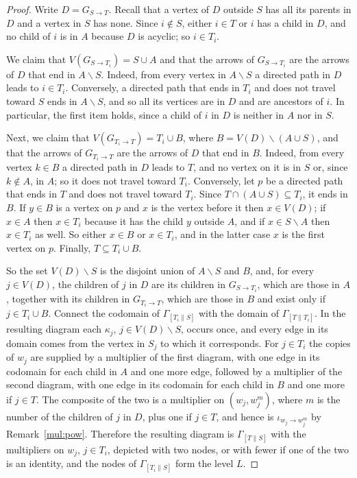 \documentclass[12pt]{amsart}
\theoremstyle{plain}
\theoremstyle{definition}
\theoremstyle{remark}
\numberwithin{equation}{section}
\theoremstyle{plain}
\newcommand{\0}{\emptyset}
\newcommand{\sub}{\subseteq}
\newcommand{\mi}{\smallsetminus}
\newcommand{\stri}{\Gamma}
\begin{document}
\begin{proof}
Write $D = G_{S \rightarrow T}$. Recall that a vertex of $D$ outside $S$ has all its parents in $D$ and a vertex in $S$ has none. Since $i \notin S$, either $i \in T$ or $i$ has a child in $D$, and no child of $i$ is in $A$ because $D$ is acyclic; so $i \in T_i$.

We claim that $V(G_{S \rightarrow T_i}) = S \cup A$ and that the arrows of $G_{S \rightarrow T_i}$ are the arrows of $D$ that end in $A \mi S$. Indeed, from every vertex in $A \mi S$ a directed path in $D$ leads to $i \in T_i$. Conversely, a directed path that ends in $T_i$ and does not travel toward $S$ ends in $A \mi S$, and so all its vertices are in $D$ and are ancestors of $i$. In particular, the first item holds, since a child of $i$ in $D$ is neither in $A$ nor in $S$.

Next, we claim that $V(G_{T_i \rightarrow T}) = T_i \cup B$, where $B = V(D) \mi (A \cup S)$, and that the arrows of $G_{T_i \rightarrow T}$ are the arrows of $D$ that end in $B$. Indeed, from every vertex $k \in B$ a directed path in $D$ leads to $T$, and no vertex on it is in $S$ or, since $k \notin A$, in $A$; so it does not travel toward $T_i$. Conversely, let $p$ be a directed path that ends in $T$ and does not travel toward $T_i$. Since $T \cap (A \cup S) \sub T_i$, it ends in $B$. If $y \in B$ is a vertex on $p$ and $x$ is the vertex before it then $x \in V(D)$; if $x \in A$ then $x \in T_i$ because it has the child $y$ outside $A$, and if $x \in S \mi A$ then $x \in T_i$ as well. So either $x \in B$ or $x \in T_i$, and in the latter case $x$ is the first vertex on $p$. Finally, $T \sub T_i \cup B$.

So the set $V(D) \mi S$ is the disjoint union of $A \mi S$ and $B$, and, for every $j \in V(D)$, the children of $j$ in $D$ are its children in $G_{S \rightarrow T_i}$, which are those in $A$, together with its children in $G_{T_i \rightarrow T}$, which are those in $B$ and exist only if $j \in T_i \cup B$. Connect the codomain of $\stri_{[{T_i} \| S]}$ with the domain of $\stri_{[{T} \| {T_i}]}$. In the resulting diagram each $\kappa_j$, $j \in V(D) \mi S$, occurs once, and every edge in its domain comes from the vertex in $S_j$ to which it corresponds. For $j \in T_i$ the copies of $w_j$ are supplied by a multiplier of the first diagram, with one edge in its codomain for each child in $A$ and one more edge, followed by a multiplier of the second diagram, with one edge in its codomain for each child in $B$ and one more if $j \in T$. The composite of the two is a multiplier on $(w_j, w_j^m)$, where $m$ is the number of the children of $j$ in $D$, plus one if $j \in T$, and hence is $\iota_{w_j \rightarrow w_j^m}$ by Remark~\ref{mul:pow}. Therefore the resulting diagram is $\stri_{[T \| S]}$ with the multipliers on $w_j$, $j \in T_i$, depicted with two nodes, or with fewer if one of the two is an identity, and the nodes of $\stri_{[{T_i} \| S]}$ form the level $L$.
\end{proof}
\end{document}
